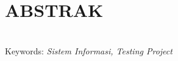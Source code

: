 %

\chapter*{ABSTRAK}

\begin{singlespace}
\blindtext \\[20pt]
Keywords: \textit{Sistem Informasi, Testing Project}
\end{singlespace}

\newpage